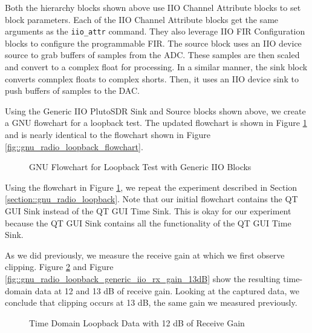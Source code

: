 \documentclass{article}
\begin{document}
Both the hierarchy blocks shown above use IIO Channel Attribute blocks to set block parameters. Each of the IIO Channel Attribute blocks get the same arguments as the \texttt{iio\_attr} command. They also leverage  IIO FIR Configuration blocks to configure the programmable FIR. The source block uses an IIO device source to grab buffers of samples from the ADC. These samples are then scaled and convert to a complex float for processing. In a similar manner, the sink block converts comnplex floats to complex shorts. Then, it uses an IIO device sink to push buffers of samples to the DAC. 

Using the Generic IIO PlutoSDR Sink and Source blocks shown above, we create a GNU flowchart for a loopback test. The updated flowchart is shown in Figure \ref{fig::gnu_radio_loopback_generic_iio} and is nearly identical to the flowchart shown in Figure \ref{fig::gnu_radio_loopback_flowchart}.

\begin{figure}[H]
	\centerline{}
	\caption{GNU Flowchart for Loopback Test with Generic IIO Blocks}
	\label{fig::gnu_radio_loopback_generic_iio}
\end{figure}

Using the flowchart in Figure \ref{fig::gnu_radio_loopback_generic_iio}, we repeat the experiment described in Section \ref{section::gnu_radio_loopback}. Note that our initial flowchart contains the QT GUI Sink instead of the QT GUI Time Sink. This is okay for our experiment because the QT GUI Sink contains all the functionality of the QT GUI Time Sink.

As we did previously, we measure the receive gain at which we first observe clipping. Figure \ref{fig::gnu_radio_loopback_generic_iio_rx_gain_12dB} and Figure 
\ref{fig::gnu_radio_loopback_generic_iio_rx_gain_13dB} show the resulting time-domain data at 12 and 13 dB of receive gain. Looking at the captured data, we conclude that clipping occurs at 13 dB, the same gain we measured previously.
 
\begin{figure}[H]
	\centerline{}
	\caption{Time Domain Loopback Data with 12 dB of Receive Gain}
	\label{fig::gnu_radio_loopback_generic_iio_rx_gain_12dB}
\end{figure}
\end{document}
